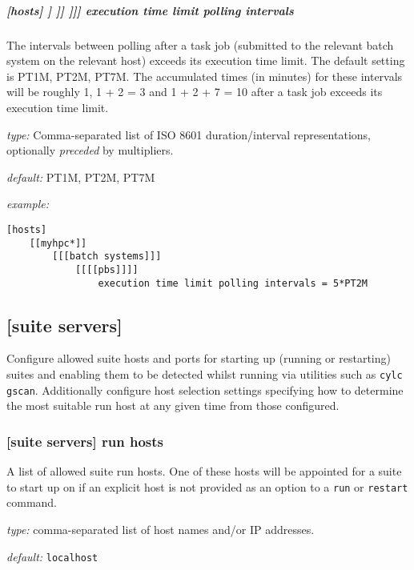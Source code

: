 \subparagraph[{[[[[}SYSTEM{]]]]}execution time limit polling intervals]{[hosts] \textrightarrow [[HOST]] \textrightarrow [[[batch systems]]] \textrightarrow [[[[SYSTEM]]]] \textrightarrow execution time limit polling intervals}
\label{ExecutionTimeLimitPollingIntervals}

The intervals between polling after a task job (submitted to the relevant batch
system on the relevant host) exceeds its execution time limit. The default
setting is PT1M, PT2M, PT7M. The accumulated times (in minutes) for these
intervals will be roughly 1, 1 + 2 = 3 and 1 + 2 + 7 = 10 after a task job
exceeds its execution time limit.

\begin{myitemize}
    \item {\em type:} Comma-separated list of ISO 8601 duration/interval
        representations, optionally {\em preceded} by multipliers.
    \item {\em default:} PT1M, PT2M, PT7M
    \item {\em example:}
    \begin{lstlisting}
[hosts]
    [[myhpc*]]
        [[[batch systems]]]
            [[[[pbs]]]]
                execution time limit polling intervals = 5*PT2M
    \end{lstlisting}
\end{myitemize}

\subsection{[suite servers] }

Configure allowed suite hosts and ports for starting up (running or
restarting) suites and enabling them to be detected whilst running via
utilities such as \lstinline=cylc gscan=. Additionally configure host
selection settings specifying how to determine the most suitable run host at
any given time from those configured.

\subsubsection[run hosts]{[suite servers] \textrightarrow run hosts }

A list of allowed suite run hosts. One of these hosts will be appointed for
a suite to start up on if an explicit host is not provided as an option to
a \lstinline=run= or \lstinline=restart= command.

\begin{myitemize}
\item {\em type:} comma-separated list of host names and/or IP addresses.
\item {\em default:} \lstinline=localhost=
\end{myitemize}

